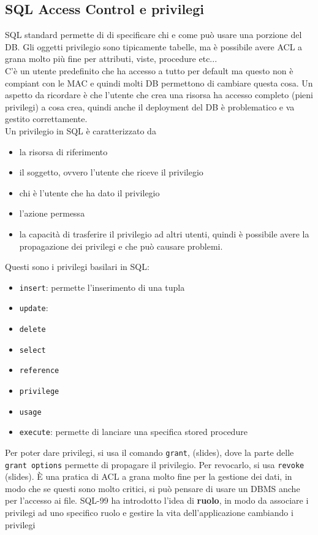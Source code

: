 \documentclass[12pt, oneside]{extbook} %
\begin{document}
\subsection{SQL Access Control e privilegi}
SQL standard permette di di specificare chi e come può usare una porzione del DB. Gli oggetti privilegio sono tipicamente tabelle, ma è possibile avere ACL a grana molto più fine per attributi, viste, procedure etc...\\C'è un utente predefinito che ha accesso a tutto per default ma questo non è compiant con le MAC e quindi molti DB permettono di cambiare questa cosa. Un aspetto da ricordare è che l'utente che crea una risorsa ha accesso completo (pieni privilegi) a cosa crea, quindi anche il deployment del DB è problematico e va gestito correttamente.\\ Un privilegio in SQL è caratterizzato da 
\begin{itemize}
	\item la risorsa di riferimento
	\item il soggetto, ovvero l'utente che riceve il privilegio
	\item chi è l'utente che ha dato il privilegio
	\item l'azione permessa
	\item la capacità di trasferire il privilegio ad altri utenti, quindi è possibile avere la propagazione dei privilegi e che può causare problemi.
\end{itemize}
Questi sono i privilegi basilari in SQL:
\begin{itemize}
	\item \texttt{insert}: permette l'inserimento di una tupla
	\item \texttt{update}: 
	\item \texttt{delete}
	\item \texttt{select}
	\item \texttt{reference}
	\item \texttt{privilege}
	\item \texttt{usage}
	\item \texttt{execute}: permette di lanciare una specifica stored procedure
\end{itemize}
Per poter dare privilegi, si usa il comando \texttt{grant}, (slides), dove la parte delle \texttt{grant options} permette di propagare il privilegio. Per revocarlo, si usa \texttt{revoke} (slides). È una pratica di ACL a grana molto fine per la gestione dei dati, in modo che se questi sono molto critici, si può pensare di usare un DBMS anche per l'accesso ai file. SQL-99 ha introdotto l'idea di \textbf{ruolo}, in modo da associare i privilegi ad uno specifico ruolo e gestire la vita dell'applicazione cambiando i privilegi
\end{document}

